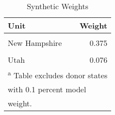 \begin{table}[H]

\caption{\label{tab:unit_weight_table_colorado}Synthetic Weights}
\centering
\begin{tabular}[t]{lr}
\toprule
Unit & Weight\\
\midrule
\cellcolor{gray!6}{Arizona} & \cellcolor{gray!6}{0.454}\\
New Hampshire & 0.375\\
\cellcolor{gray!6}{District of Columbia} & \cellcolor{gray!6}{0.095}\\
Utah & 0.076\\
\bottomrule
\multicolumn{2}{l}{\textsuperscript{a} Table excludes donor states}\\
\multicolumn{2}{l}{with 0.1 percent model}\\
\multicolumn{2}{l}{weight.}\\
\end{tabular}
\end{table}
